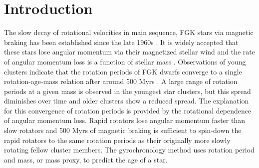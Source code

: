 \newcommand{\nastero}{40}
\newcommand{\meansep}{1}

\section{Introduction}

The slow decay of rotational velocities in main sequence, FGK stars via
magnetic braking has been established since the late 1960s
\citep[\eg][]{Weber, Skumanich}.
It is widely accepted that these stars lose angular momentum via their
magnetized stellar wind and the rate of angular momentum loss is a function of
stellar mass .
Observations of young clusters indicate that the rotation periods of FGK dwarfs
converge to a single rotation-age-mass relation after around 500 Myrs
.
A large range of rotation periods at a given mass is observed in the youngest
star clusters, but this spread diminishes over time and older clusters show a
reduced spread.
The explanation for this convergence of rotation periods is provided by the
rotational dependence of angular momentum loss.
Rapid rotators lose angular momentum faster than slow rotators and 500 Myrs of
magnetic braking is sufficient to spin-down the rapid rotators to the same
rotation periods as their originally more slowly rotating fellow cluster
members.
The gyrochronology method uses rotation period and mass, or mass proxy, to
predict the age of a star.

